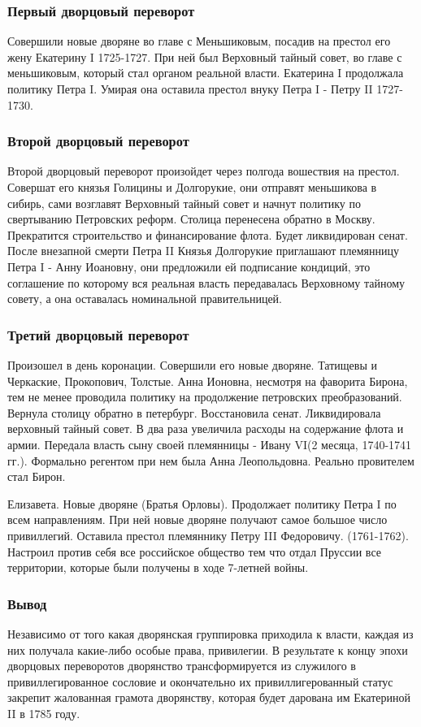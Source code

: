 \documentclass[a4paper]{article}
\begin{document}
\subsubsection{Первый дворцовый переворот}
Совершили новые дворяне во главе с Меньшиковым, посадив на престол его жену Екатерину I 1725-1727. При ней был Верховный тайный совет, во главе с меньшиковым, который стал органом реальной власти.
Екатерина I продолжала политику Петра I. Умирая она оставила престол внуку Петра I - Петру II 1727-1730.

\subsubsection{Второй дворцовый переворот}
Второй дворцовый переворот произойдет через полгода вошествия на престол.
Совершат его князья Голицины и Долгорукие, они отправят меньшикова в сибирь, сами возглавят Верховный тайный совет и начнут политику по свертыванию Петровских реформ. Столица перенесена обратно в Москву. Прекратится строительство и финансирование флота. Будет ликвидирован сенат.
После внезапной смерти Петра II Князья Долгорукие приглашают племянницу Петра I - Анну Иоановну, они предложили ей подписание кондиций, это соглашение по которому вся реальная власть передавалась Верховному тайному совету, а она оставалась номинальной правительницей.

\subsubsection{Третий дворцовый переворот}
Произошел в день коронации. Совершили его новые дворяне.
Татищевы и Черкаские, Прокопович, Толстые. Анна Ионовна, несмотря на фаворита Бирона, тем не менее проводила политику на продолжение петровских преобразований. Вернула столицу обратно в петербург. Восстановила сенат. Ликвидировала верховный тайный совет.
В два раза увеличила расходы на содержание флота и армии. Передала власть сыну своей племянницы - Ивану VI(2 месяца, 1740-1741 гг.). Формально регентом при нем была Анна Леопольдовна. Реально провителем стал Бирон.

Елизавета. Новые дворяне (Братья Орловы). Продолжает политику Петра I по всем направлениям. При ней новые дворяне получают самое большое число привиллегий. Оставила престол племяннику Петру III Федоровичу. (1761-1762). Настроил против себя все российское общество тем что отдал Пруссии все территории, которые были получены в ходе 7-летней войны.

\subsubsection{Вывод}
Независимо от того какая дворянская группировка приходила к власти, каждая из них получала какие-либо особые права, привилегии. В результате к концу эпохи дворцовых переворотов дворянство трансформируется из служилого в привиллегированное сословие и окончательно их привиллигерованный статус закрепит жалованная грамота дворянству, которая будет дарована им Екатериной II в 1785 году.
\end{document}
